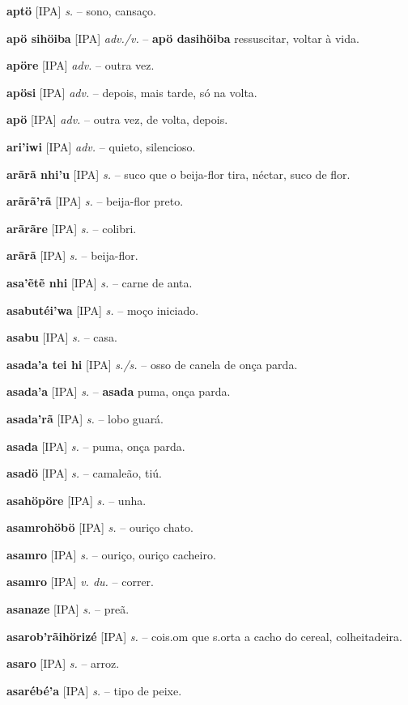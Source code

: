 \textbf{aptö} [IPA] \textit{s.} -- sono, cansaço.

\textbf{apö sihöiba} [IPA] \textit{adv./v.} -- \textbf{apö dasihöiba} ressuscitar, voltar à vida.

\textbf{apöre} [IPA] \textit{adv.} -- outra vez.

\textbf{apösi} [IPA] \textit{adv.} -- depois, mais tarde, só na volta.

\textbf{apö} [IPA] \textit{adv.} -- outra vez, de volta, depois.

\textbf{ari'iwi} [IPA] \textit{adv.} -- quieto, silencioso.

\textbf{arãrã nhi'u} [IPA] \textit{s.} -- suco que o beija-flor tira, néctar, suco de flor.

\textbf{arãrã'rã} [IPA] \textit{s.} -- beija-flor preto.

\textbf{arãrãre} [IPA] \textit{s.} -- colibri.

\textbf{arãrã} [IPA] \textit{s.} -- beija-flor.

\textbf{asa'ẽtẽ nhi} [IPA] \textit{s.} -- carne de anta.

\textbf{asabutéi'wa} [IPA] \textit{s.} -- moço iniciado.

\textbf{asabu} [IPA] \textit{s.} -- casa.

\textbf{asada'a tei hi} [IPA] \textit{s./s.} -- osso de canela de onça parda.

\textbf{asada'a} [IPA] \textit{s.} -- \textbf{asada} puma, onça parda.

\textbf{asada'rã} [IPA] \textit{s.} -- lobo guará.

\textbf{asada} [IPA] \textit{s.} -- puma, onça parda.

\textbf{asadö} [IPA] \textit{s.} -- camaleão, tiú.

\textbf{asahöpöre} [IPA] \textit{s.} -- unha.

\textbf{asamrohöbö} [IPA] \textit{s.} -- ouriço chato.

\textbf{asamro} [IPA] \textit{s.} -- ouriço, ouriço cacheiro.

\textbf{asamro} [IPA] \textit{v. du.} -- correr.

\textbf{asanaze} [IPA] \textit{s.} -- preã.

\textbf{asarob'rãihörizé} [IPA] \textit{s.} -- cois.om que s.orta a cacho do cereal, colheitadeira.

\textbf{asaro} [IPA] \textit{s.} -- arroz.

\textbf{asarébé'a} [IPA] \textit{s.} -- tipo de peixe.

